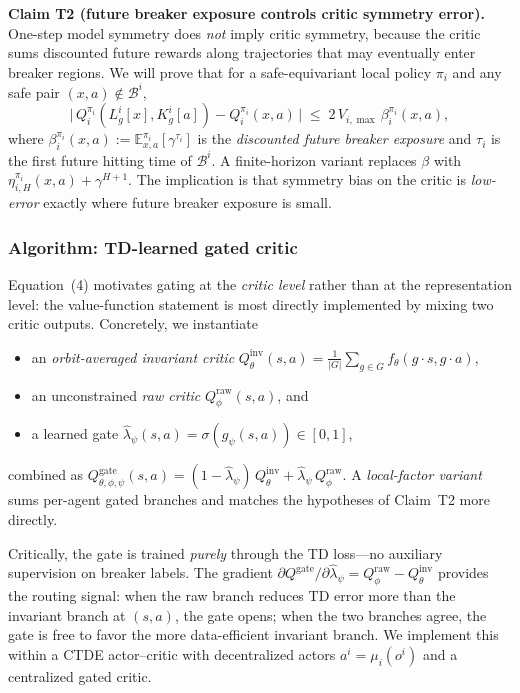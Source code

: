 \documentclass[11pt]{article}
\begin{document}
\textbf{Claim T2 (future breaker exposure controls critic symmetry error).}
One-step model symmetry does \textit{not} imply critic symmetry, because the critic
sums discounted future rewards along trajectories that may eventually enter
breaker regions. We will prove that for a safe-equivariant local policy
$\pi_i$ and any safe pair $(x, a) \notin \mathcal{B}^i$,
\begin{equation}
\bigl|\,Q^{\pi_i}_i(L^i_g[x], K^i_g[a]) - Q^{\pi_i}_i(x,a)\,\bigr|
\;\le\; 2\,V_{i,\max}\,\beta^{\pi_i}_i(x,a), \tag{4}
\end{equation}
where $\beta^{\pi_i}_i(x,a) := \mathbb{E}^{\pi_i}_{x,a}[\gamma^{\tau_i}]$ is
the \textit{discounted future breaker exposure} and $\tau_i$ is the first future
hitting time of $\mathcal{B}^i$. A finite-horizon variant replaces $\beta$
with $\eta^{\pi_i}_{i,H}(x,a) + \gamma^{H+1}$. The implication is that
symmetry bias on the critic is \textit{low-error} exactly where future breaker
exposure is small.

\subsubsection*{Algorithm: TD-learned gated critic}

Equation~(4) motivates gating at the \textit{critic level} rather than at the
representation level: the value-function statement is most directly
implemented by mixing two critic outputs. Concretely, we instantiate
\begin{itemize}[noitemsep,topsep=2pt]
  \item an \textit{orbit-averaged invariant critic}
    $Q^{\text{inv}}_\theta(s, a) = \tfrac{1}{|G|}\sum_{g \in G} f_\theta(g\!\cdot\!s, g\!\cdot\!a)$,
  \item an unconstrained \textit{raw critic} $Q^{\text{raw}}_\phi(s, a)$, and
  \item a learned gate
    $\widehat{\lambda}_\psi(s,a) = \sigma(g_\psi(s,a)) \in [0,1]$,
\end{itemize}
combined as
$Q^{\text{gate}}_{\theta,\phi,\psi}(s,a) =
(1-\widehat{\lambda}_\psi)\,Q^{\text{inv}}_\theta + \widehat{\lambda}_\psi\,Q^{\text{raw}}_\phi.$
A \textit{local-factor variant} sums per-agent gated branches and matches the
hypotheses of Claim~T2 more directly.

Critically, the gate is trained \textit{purely} through the TD loss---no auxiliary
supervision on breaker labels. The gradient
$\partial Q^{\text{gate}}/\partial \widehat{\lambda}_\psi
= Q^{\text{raw}}_\phi - Q^{\text{inv}}_\theta$
provides the routing signal: when the raw branch reduces TD error more than
the invariant branch at $(s,a)$, the gate opens; when the two branches agree,
the gate is free to favor the more data-efficient invariant branch. We
implement this within a CTDE actor--critic with decentralized actors
$a^i = \mu_i(o^i)$ and a centralized gated critic.
\end{document}
